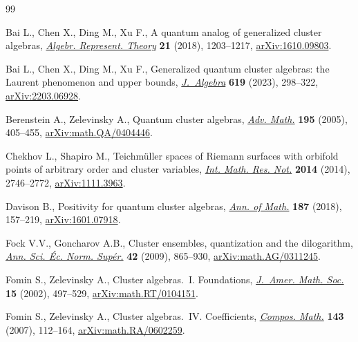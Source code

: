 \documentclass[pdftex]{sigma}
\numberwithin{equation}{section}
\begin{document}
\begin{thebibliography}{99}
\footnotesize\itemsep=0pt

Bai L., Chen X., Ding M., Xu F., A quantum analog of generalized cluster
  algebras, \href{https://doi.org/10.1007/s10468-017-9743-7}{\textit{Algebr. Represent. Theory}} \textbf{21} (2018), 1203--1217,
  \href{https://arxiv.org/abs/1610.09803}{arXiv:1610.09803}.

Bai L., Chen X., Ding M., Xu F., Generalized quantum cluster algebras: the
  {L}aurent phenomenon and upper bounds, \href{https://doi.org/10.1016/j.jalgebra.2022.12.012}{\textit{J.~Algebra}} \textbf{619}
  (2023), 298--322, \href{https://arxiv.org/abs/2203.06928}{arXiv:2203.06928}.

Berenstein A., Zelevinsky A., Quantum cluster algebras, \href{https://doi.org/10.1016/j.aim.2004.08.003}{\textit{Adv. Math.}}
  \textbf{195} (2005), 405--455, \href{https://arxiv.org/abs/math.QA/0404446}{arXiv:math.QA/0404446}.

Chekhov L., Shapiro M., Teichm\"uller spaces of {R}iemann surfaces with
  orbifold points of arbitrary order and cluster variables,  \href{https://doi.org/10.1093/imrn/rnt016}{\textit{Int. Math.
  Res. Not.}} \textbf{2014} (2014), 2746--2772, \href{https://arxiv.org/abs/1111.3963}{arXiv:1111.3963}.

Davison B., Positivity for quantum cluster algebras,  \href{https://doi.org/10.4007/annals.2018.187.1.3}{\textit{Ann. of Math.}}
  \textbf{187} (2018), 157--219, \href{https://arxiv.org/abs/1601.07918}{arXiv:1601.07918}.

Fock V.V., Goncharov A.B., Cluster ensembles, quantization and the dilogarithm,
   \href{https://doi.org/10.24033/asens.2112}{\textit{Ann. Sci. \'Ec. Norm. Sup\'er.}} \textbf{42} (2009), 865--930,
  \href{https://arxiv.org/abs/math.AG/0311245}{arXiv:math.AG/0311245}.

Fomin S., Zelevinsky A., Cluster algebras.~{I}. {F}oundations, \href{https://doi.org/10.1090/S0894-0347-01-00385-X}{\textit{J.~Amer.
  Math. Soc.}} \textbf{15} (2002), 497--529, \href{https://arxiv.org/abs/math.RT/0104151}{arXiv:math.RT/0104151}.

Fomin S., Zelevinsky A., Cluster algebras.~{IV}. {C}oefficients,
  \href{https://doi.org/10.1112/S0010437X06002521}{\textit{Compos. Math.}} \textbf{143} (2007), 112--164,
  \href{https://arxiv.org/abs/math.RA/0602259}{arXiv:math.RA/0602259}.


\end{thebibliography}
\end{document}
